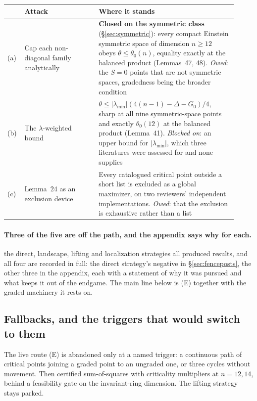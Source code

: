\begin{center}
\begin{tabular}{@{}p{0.05\linewidth}p{0.30\linewidth}p{0.57\linewidth}@{}}
\toprule
& \textbf{Attack} & \textbf{Where it stands} \\
\midrule
(a) & Cap each non-diagonal family analytically & \textbf{Closed on the symmetric class} (\S\ref{sec:symmetric}): every compact Einstein symmetric space of dimension $n\ge12$ obeys $\theta\le\theta_0(n)$, equality exactly at the balanced product (Lemmas~47, 48). \emph{Owed}: the $S=0$ points that are not symmetric spaces, gradedness being the broader condition \\
(b) & The $\lambda$-weighted bound & $\theta\le|\lambda_{\min}|(4(n-1)-\Delta-G_0)/4$, sharp at all nine symmetric-space points and exactly $\theta_0(12)$ at the balanced product (Lemma~41). \emph{Blocked on}: an upper bound for $|\lambda_{\min}|$, which three literatures were assessed for and none supplies \\
(c) & Lemma~24 as an exclusion device & Every catalogued critical point outside a short list is excluded as a global maximizer, on two reviewers' independent implementations. \emph{Owed}: that the exclusion is exhaustive rather than a list \\
\bottomrule
\end{tabular}
\end{center}

\paragraph{Three of the five are off the path, and the appendix says why for each.} the direct, landscape, lifting and localization strategies all produced results, and all four are recorded in full: the direct strategy's negative in \S\ref{sec:fenceposts}, the other three in the appendix, each with a statement of why it was pursued and what keeps it out of the endgame. The main line below is (E) together with the graded machinery it rests on.

\subsection{Fallbacks, and the triggers that would switch to them}

The live route (E) is abandoned only at a named trigger: a continuous path of critical points joining a graded point to an ungraded one, or three cycles without movement. Then certified sum-of-squares with criticality multipliers at $n=12,14$, behind a feasibility gate on the invariant-ring dimension. The lifting strategy stays parked.

